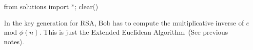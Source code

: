 \begin{python0}
from solutions import *; clear()
\end{python0}

In the key generation for RSA, Bob has to compute the
multiplicative inverse of $e$ mod $\phi(n)$. This is just the
Extended Euclidean Algorithm. (See previous notes).

